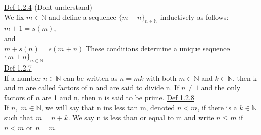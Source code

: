 \documentclass[12pt]{amsart}
\begin{document}
\begin{enumerate}
\hdashrule[0.5ex][c]{\linewidth}{0.5pt}{1.5mm}


\underline{Def 1.2.4} (Dont understand)\\
We fix $m \in \mathbb{N}$ and define a sequence $\{ m + n \}_{n \in \mathbb{N}}$ inductively as follows:\\
$m+1 = s(m)$,\\
and \\
$m+ s(n) = s(m+n)$
These conditions determine a unique sequence $\{ m+ n \}_{n \in \mathbb{N}}$\\
\underline{Def 1.2.7}\\
If a number $n \in \mathbb{N}$ can be written as $n = mk$ with both $m \in \mathbb{N}$ and $k \in \mathbb{N}$, then k and m are called factors of n and are said to divide n. If $n \neq 1$ and the only factors of $n$ are 1 and n, then n is said to be prime.
\underline{Def 1.2.8}\\
If $n,\,\, m \in \mathbb{N}$, we will say that n ins less tan m, denoted $n <m$, if there is a $k \in \mathbb{N}$ such that $m = n + k$. We say n is less than or equal to m and write $n \leq m$ if $n < m$ or $n=m$.


\hdashrule[0.5ex][c]{\linewidth}{0.5pt}{1.5mm}



\end{enumerate}
\end{document}
